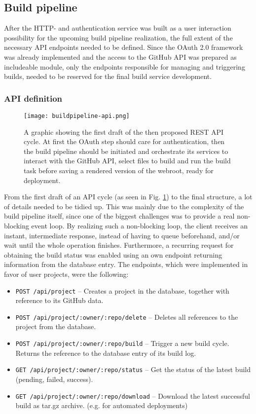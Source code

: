 \subsection{Build pipeline}
\label{sec:structure-buildpipeline}
After the HTTP- and authentication service was built as a user interaction possibility for the upcoming build pipeline realization, the full extent of the necessary API endpoints needed to be defined. Since the OAuth 2.0 framework was already implemented and the access to the GitHub API was prepared as includeable module, only the endpoints responsible for managing and triggering builds, needed to be reserved for the final build service development.

\subsubsection{API definition}

\begin{figure} %
    \centering
    \texttt{[image: buildpipeline-api.png]}
    \caption{A graphic showing the first draft of the then proposed REST API cycle. At first the OAuth step should care for authentication, then the build pipeline should be initiated and orchestrate its services to interact with the GitHub API, select files to build and run the build task before saving a rendered version of the webroot, ready for deployment.}
    \label{fig:buildpipeline-api}
\end{figure}
%

From the first draft of an API cycle (as seen in Fig. \ref{fig:buildpipeline-api}) to the final structure, a lot of details needed to be tidied up. This was mainly due to the complexity of the build pipeline itself, since one of the biggest challenges was to provide a real non-blocking event loop. By realizing such a non-blocking loop, the client receives an instant, intermediate response, instead of having to queue beforehand, and/or wait until the whole operation finishes. Furthermore, a recurring request for obtaining the build status was enabled using an own endpoint returning information from the database entry.
The endpoints, which were implemented in favor of user projects, were the following:

\begin{itemize}
  \item \texttt{POST /api/project} -- Creates a project in the database, together with reference to its GitHub data.
  \item \texttt{POST /api/project/:owner/:repo/delete} -- Deletes all references to the project from the database.
  \item \texttt{POST /api/project/:owner/:repo/build} -- Trigger a new build cycle. Returns the reference to the database entry of its build log.
  \item \texttt{GET /api/project/:owner/:repo/status} -- Get the status of the latest build (pending, failed, success).
  \item \texttt{GET /api/project/:owner/:repo/download} -- Download the latest successful build as tar.gz archive. (e.g. for automated deployments)
\end{itemize}

